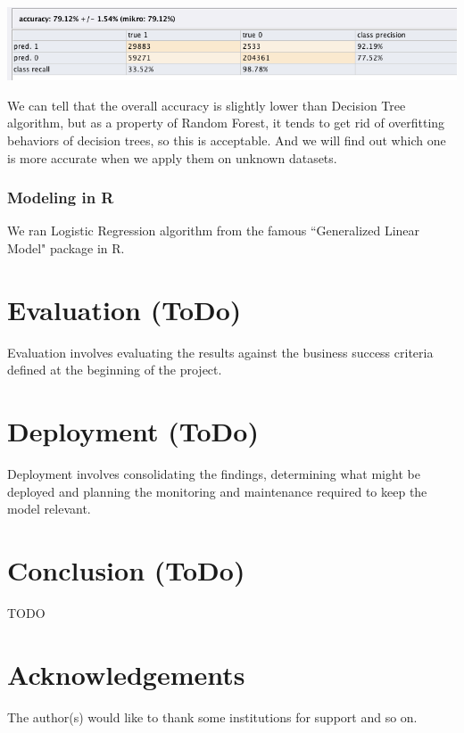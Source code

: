 \documentclass[CEJM,PDF]{cej} %
\begin{document}
\begin{center}
\includegraphics[scale=0.5]{03_Randforest_performance.png}
\end{center} 
We can tell that the overall accuracy is slightly lower than Decision Tree algorithm, but as a property of Random Forest, it tends to get rid of overfitting behaviors of decision trees, so this is acceptable. And we will find out which one is more accurate when we apply them on unknown datasets.\\

\subsubsection{Modeling in R}
We ran Logistic Regression algorithm from the famous ``Generalized Linear Model" package in R.

\section{Evaluation (ToDo)}
Evaluation involves evaluating the results against the business success criteria defined at the beginning of the project.


\section{Deployment (ToDo)}
Deployment involves consolidating the findings, determining what might be deployed and planning the monitoring and maintenance required to keep the model relevant.

\section{Conclusion (ToDo)}
TODO


\section*{Acknowledgements}

The author(s) would like to thank some institutions for support and so on.
\end{document}
